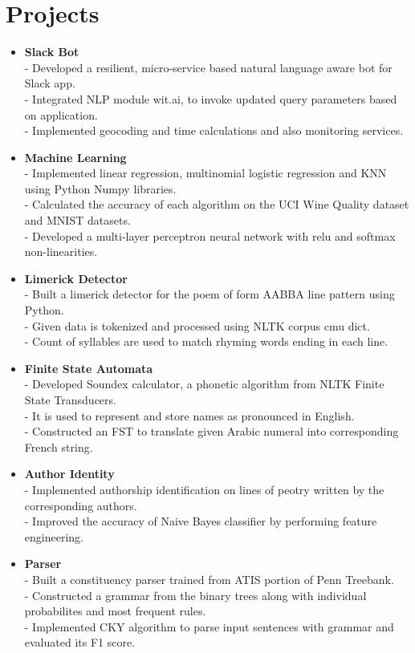 \section {Projects}
\begin{itemize}

 \item \textbf{Slack Bot} \\
 - Developed a resilient, micro-service based natural language aware bot for Slack app.\\
 - Integrated NLP module wit.ai, to invoke updated query parameters based on application.\\
 - Implemented geocoding and time calculations and also monitoring services.

 \item \textbf{Machine Learning} \\
 - Implemented linear regression, multinomial logistic regression and KNN using Python Numpy libraries. \\
 - Calculated the accuracy of each algorithm on the UCI Wine Quality dataset and MNIST datasets.\\
 - Developed a multi-layer perceptron neural network with relu and softmax non-linearities. 

  \item \textbf{Limerick Detector} \\
 - Built a limerick detector for the poem of form AABBA line pattern using Python.\\
 - Given data is tokenized and processed using NLTK corpus cmu dict.\\
 - Count of syllables are used to match rhyming words ending in each line.

 \item \textbf{Finite State Automata} \\
 - Developed Soundex calculator, a phonetic algorithm  from NLTK Finite State Transducers.\\
 - It is used to represent and store names as pronounced in English.\\
 - Constructed an FST to translate given Arabic numeral into corresponding French string.

 \item \textbf{Author Identity} \\
 - Implemented authorship identification on lines of peotry written by the corresponding authors.\\
 - Improved the accuracy of Naive Bayes classifier by performing feature engineering.

 \item \textbf{Parser} \\
 - Built a constituency parser trained from ATIS portion of Penn Treebank.\\
 - Constructed a grammar from the binary trees along with individual probabilites and most frequent rules. \\
 - Implemented CKY algorithm to parse input sentences with grammar and evaluated its F1 score.\\
\end{itemize}
